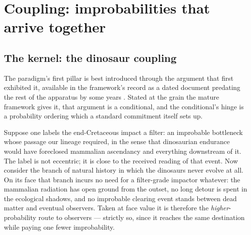 \documentclass[11pt]{article}
\theoremstyle{definition}
\begin{document}
\section{Coupling: improbabilities that arrive together}
\label{sec:coupling}

\subsection{The kernel: the dinosaur coupling}
\label{sec:coupling-kernel}

The paradigm's first pillar is best introduced through the argument that first exhibited it, available in the framework's record as a dated document predating the rest of the apparatus by some years \cite{Nexus}. Stated at the grain the mature framework gives it, that argument is a conditional, and the conditional's hinge is a probability ordering which a standard commitment itself sets up.

Suppose one labels the end-Cretaceous impact a filter: an improbable bottleneck whose passage our lineage required, in the sense that dinosaurian endurance would have foreclosed mammalian ascendancy and everything downstream of it. The label is not eccentric; it is close to the received reading of that event. Now consider the branch of natural history in which the dinosaurs never evolve at all. On its face that branch incurs no need for a filter-grade impactor whatever: the mammalian radiation has open ground from the outset, no long detour is spent in the ecological shadows, and no improbable clearing event stands between dead matter and eventual observers. Taken at face value it is therefore the \emph{higher}-probability route to observers --- strictly so, since it reaches the same destination while paying one fewer improbability.
\end{document}
